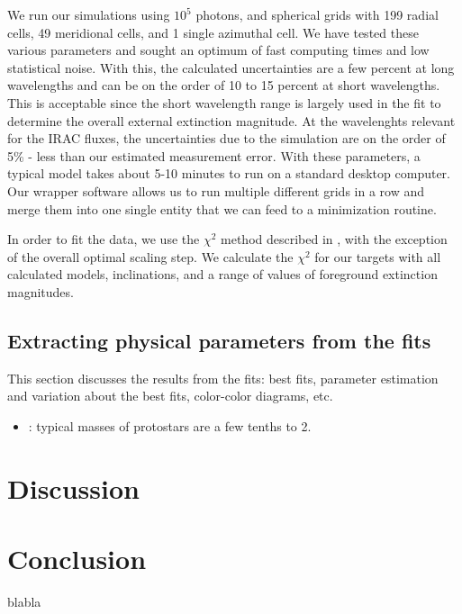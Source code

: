 We run our simulations using $10^5$ photons, and spherical grids with 199 radial cells, 49 meridional cells, and 1 single azimuthal cell. We have tested these various parameters and sought an optimum of fast computing times and low statistical noise. With this, the calculated uncertainties are a few percent at long wavelengths and can be on the order of 10 to 15 percent at short wavelengths. This is acceptable since the short wavelength range is largely used in the fit to determine the overall external extinction magnitude. At the wavelenghts relevant for the IRAC fluxes, the uncertainties due to the simulation are on the order of 5\% - less than our estimated measurement error. With these parameters, a typical model takes about 5-10 minutes to run on a standard desktop computer. Our wrapper software allows us to run multiple different grids in a row and merge them into one single entity that we can feed to a minimization routine.

In order to fit the data, we use the $\chi^2$ method described in \cite{Robitaille:2007dl}, with the exception of the overall optimal scaling step. We calculate the $\chi^2$ for our targets with all calculated models, inclinations, and a range of values of foreground extinction magnitudes.








\subsection{Extracting physical parameters from the fits}
This section discusses the results from the fits: best fits, parameter estimation and variation about the best fits, color-color diagrams, etc.
\begin{itemize}
\item \citep{Shirley:2000gh}: typical masses of protostars are a few tenths to \SI{2}{\Msun}. 

\end{itemize}


\section{Discussion}

\section{Conclusion}
blabla